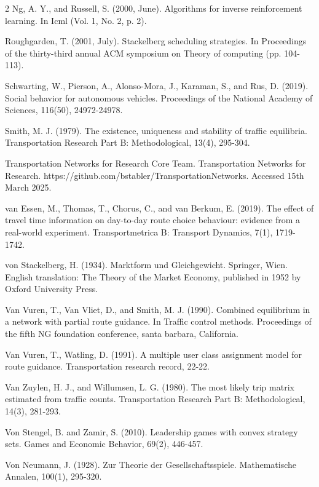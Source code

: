 \documentclass[a4paper,11pt]{article}
\begin{document}
\begin{thebibliography}{2}
 Ng, A. Y., and Russell, S. (2000, June). Algorithms for inverse reinforcement learning. In Icml (Vol. 1, No. 2, p. 2).

 Roughgarden, T. (2001, July). Stackelberg scheduling strategies. In Proceedings of the thirty-third annual ACM symposium on Theory of computing (pp. 104-113).

Schwarting, W., Pierson, A., Alonso-Mora, J., Karaman, S., and Rus, D. (2019). Social behavior for autonomous vehicles. Proceedings of the National Academy of Sciences, 116(50), 24972-24978.


 Smith, M. J. (1979). The existence, uniqueness and stability of traffic equilibria. Transportation Research Part B: Methodological, 13(4), 295-304.

Transportation Networks for Research Core Team. Transportation Networks for Research. https://github.com/bstabler/TransportationNetworks. Accessed 15th March 2025.

 van Essen, M., Thomas, T., Chorus, C., and van Berkum, E. (2019). The effect of travel time information on day-to-day route choice behaviour: evidence from a real-world experiment. Transportmetrica B: Transport Dynamics, 7(1), 1719-1742.

 von Stackelberg, H. (1934). Marktform und Gleichgewicht. Springer, Wien. English translation: The Theory of the Market Economy, published in 1952 by Oxford University Press.

 Van Vuren, T., Van Vliet, D., and Smith, M. J. (1990). Combined equilibrium in a network with partial route guidance. In Traffic control methods. Proceedings of the fifth NG foundation conference, santa barbara, California.

 Van Vuren, T., Watling, D. (1991). A multiple user class assignment model for route guidance. Transportation research record, 22-22.

 Van Zuylen, H. J., and Willumsen, L. G. (1980). The most likely trip matrix estimated from traffic counts. Transportation Research Part B: Methodological, 14(3), 281-293.

 Von Stengel, B. and Zamir, S. (2010). Leadership games with convex strategy sets. Games and Economic Behavior, 69(2), 446-457.

 Von Neumann, J. (1928). Zur Theorie der Gesellschaftsspiele. Mathematische Annalen, 100(1), 295-320.


\end{thebibliography}
\end{document}

